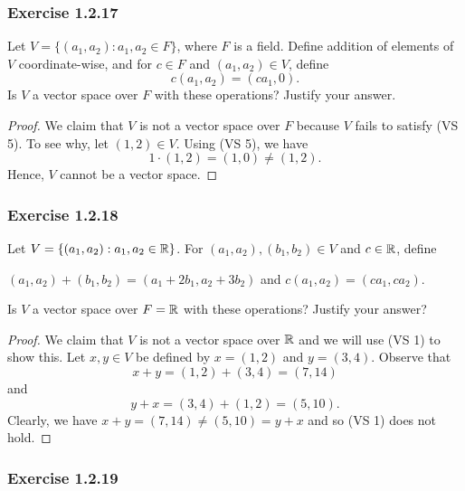 \subsubsection{Exercise 1.2.17}

Let \( V = \{ (a_{1}, a_{2}) : a_{1}, a_{2} \in F   \}  \), where \( F  \) is a field. Define addition of elements of \( V  \) coordinate-wise, and for \( c \in F  \) and \( (a_{1} , a_{2}) \in V   \), define 
\[  c(a_{1}, a_{2} ) = (ca_{1}, 0 ).\]
Is \( V  \) a vector space over \( F  \) with these operations? Justify your answer.

\begin{proof}
    We claim that \( V  \) is not a vector space over \( F  \) because \( V  \) fails to satisfy (VS 5). To see why, let \( (1,2) \in V  \). Using (VS 5), we have 
    \[  1 \cdot (1,2) = (1,0) \neq (1,2). \]
    Hence, \( V  \) cannot be a vector space.
\end{proof}

\subsubsection{Exercise 1.2.18} Let \( V = \{ (a_{1}, a_{2}  ) : a_{1}, a_{2} \in \mathbb{R}  \}   \). For \( (a_{1}, a_{2}), (b_{1} , b_{2} ) \in V  \) and \( c \in \mathbb{R}  \), define 
\begin{center}
    \( (a_{1}, a_{2} ) + (b_{1} , b_{2} ) = (a_{1} + 2 b_{1} , a_{2} + 3 b_{2} ) \) and \( c(a_{1}, a_{2} ) = (ca_{1}, ca_{2})  \). 
\end{center}
Is \( V  \) a vector space over \( F = \mathbb{R}   \) with these operations? Justify your answer?

\begin{proof}
We claim that \( V  \) is not a vector space over \( \mathbb{R}   \) and we will use (VS 1) to show this. Let \( x,y \in V  \) be defined by \( x = (1,2)  \) and \( y = (3,4)  \). Observe that 
\[  x + y = (1,2) + (3,4) = (7,14)  \]  and
\[  y + x = (3,4)  + (1,2) = (5,10). \]
Clearly, we have \(  x + y  = (7,14) \neq (5,10) = y + x  \) and so (VS 1) does not hold.
\end{proof}

\subsubsection{Exercise 1.2.19}


